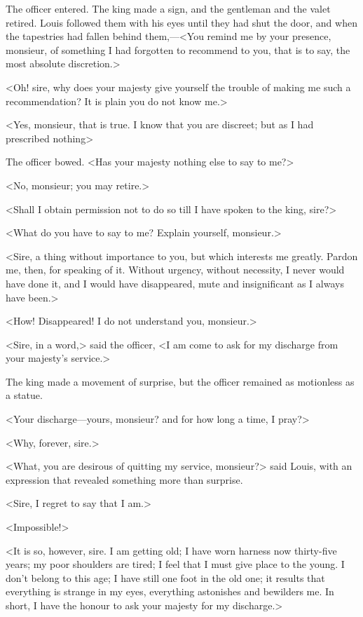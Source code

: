 The officer entered. The king made a sign, and the gentleman and the valet retired. Louis followed them with his eyes until they had shut the door, and when the tapestries had fallen behind them,—<You remind me by your presence, monsieur, of something I had forgotten to recommend to you, that is to say, the most absolute discretion.>

<Oh! sire, why does your majesty give yourself the trouble of making me such a recommendation? It is plain you do not know me.>

<Yes, monsieur, that is true. I know that you are discreet; but as I had prescribed nothing\longdash>

The officer bowed. <Has your majesty nothing else to say to me?>

<No, monsieur; you may retire.>

<Shall I obtain permission not to do so till I have spoken to the king, sire?>

<What do you have to say to me? Explain yourself, monsieur.>

<Sire, a thing without importance to you, but which interests me greatly. Pardon me, then, for speaking of it. Without urgency, without necessity, I never would have done it, and I would have disappeared, mute and insignificant as I always have been.>

<How! Disappeared! I do not understand you, monsieur.>

<Sire, in a word,> said the officer, <I am come to ask for my discharge from your majesty's service.>

The king made a movement of surprise, but the officer remained as motionless as a statue.

<Your discharge—yours, monsieur? and for how long a time, I pray?>

<Why, forever, sire.>

<What, you are desirous of quitting my service, monsieur?> said Louis, with an expression that revealed something more than surprise.

<Sire, I regret to say that I am.>

<Impossible!>

<It is so, however, sire. I am getting old; I have worn harness now thirty-five years; my poor shoulders are tired; I feel that I must give place to the young. I don't belong to this age; I have still one foot in the old one; it results that everything is strange in my eyes, everything astonishes and bewilders me. In short, I have the honour to ask your majesty for my discharge.>

